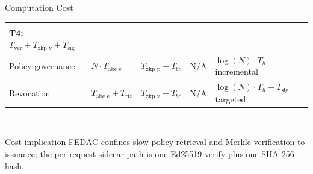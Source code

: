 \documentclass[aspectratio=169,11pt]{beamer}
\begin{document}
\begin{frame}{Computation Cost}
{\begin{tabular}{p{2.5cm}p{3.0cm}p{3.0cm}p{3.0cm}p{4.0cm}}
{                                     \textbf{T3:} $T_{\mathrm{ver}} {+} kT_h {+} T_{\mathrm{sig}}$\\
                                     \textbf{T4:} $T_{\mathrm{ver}} {+} T_{\mathrm{zkp\_v}} {+} T_{\mathrm{sig}}$}\\
Policy governance   & $N{\cdot}T_{\mathrm{abe\_e}}$
                    & $T_{\mathrm{zkp\_p}} {+} T_{bc}$
                    & N/A
                    & $\log(N){\cdot}T_h$ incremental\\
Revocation          & $T_{\mathrm{abe\_e}} {+} T_{\mathrm{rtt}}$
                    & $T_{\mathrm{zkp\_v}} {+} T_{bc}$
                    & N/A
                    & $\log(N){\cdot}T_h {+} T_{\mathrm{sig}}$ targeted\\
\bottomrule
\end{tabular}}\\[6pt]
\begin{callout}{Cost implication}
FEDAC confines slow policy retrieval and Merkle verification to issuance; the per-request sidecar
path is one Ed25519 verify plus one SHA-256 hash.
\end{callout}
\vfill
\end{frame}
\end{document}
